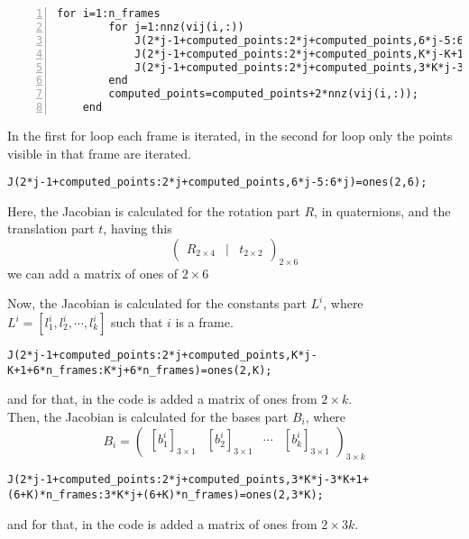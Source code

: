 \begin{lstlisting}[style=Matlab-editor, numbers=left]
for i=1:n_frames
        for j=1:nnz(vij(i,:))        
            J(2*j-1+computed_points:2*j+computed_points,6*j-5:6*j)=ones(2,6);
            J(2*j-1+computed_points:2*j+computed_points,K*j-K+1+6*n_frames:K*j+6*n_frames)=ones(2,K);
            J(2*j-1+computed_points:2*j+computed_points,3*K*j-3*K+1+(6+K)*n_frames:3*K*j+(6+K)*n_frames)=ones(2,3*K);
        end
        computed_points=computed_points+2*nnz(vij(i,:));
    end
\end{lstlisting}
\noindent In the first for loop each frame is iterated, in the second for loop only the points visible in that frame are iterated.\\
\begin{lstlisting}[style=Matlab-editor]
J(2*j-1+computed_points:2*j+computed_points,6*j-5:6*j)=ones(2,6);
\end{lstlisting}
\noindent Here, the Jacobian is calculated for the rotation part $R$, in quaternions, and the translation part $t$, having this
\begin{equation}
\begin{pmatrix}
R_{2\times 4} & | & t_{2\times 2}
\end{pmatrix}_{2\times 6}
\end{equation}
we can add a matrix of ones of $2\times 6$

\noindent Now, the Jacobian is calculated for the constants part $L^{i}$, where $L^{i}=[l_{1}^{i},l_{2}^{i}, \cdots, l_{k}^{i}]$ such that $i$ is a frame.
\begin{lstlisting}[style=Matlab-editor]
J(2*j-1+computed_points:2*j+computed_points,K*j-K+1+6*n_frames:K*j+6*n_frames)=ones(2,K);
\end{lstlisting}
and for that, in the code is added a matrix of ones from $2\times k$.\\

\noindent Then, the Jacobian is calculated for the bases part $B_{i}$, where
\begin{equation}
B_{i}=\begin{pmatrix}
[b_{1}^{i}]_{3\times 1} & [b_{2}^{i}]_{3\times 1} & \cdots & [b_{k}^{i}]_{3\times 1}
\end{pmatrix}_{3\times k}
\end{equation}
\begin{lstlisting}[style=Matlab-editor]
J(2*j-1+computed_points:2*j+computed_points,3*K*j-3*K+1+(6+K)*n_frames:3*K*j+(6+K)*n_frames)=ones(2,3*K);
\end{lstlisting}
\noindent and for that, in the code is added a matrix of ones from $2\times 3k$.\\ 

